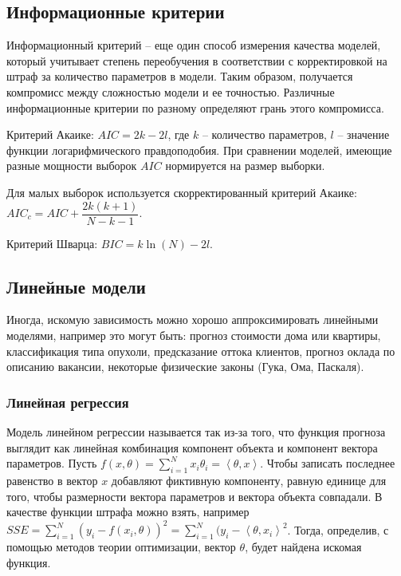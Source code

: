 \subsection{Информационные критерии}

Информационный критерий -- еще один способ измерения качества моделей, который учитывает степень переобучения в соответствии с корректировкой на штраф за количество параметров в модели. Таким образом, получается компромисс между сложностью модели и ее точностью. Различные информационные критерии по разному определяют грань этого компромисса.

\begin{description}[font=$\bullet$]
    \item Критерий Акаике: $AIC = 2k - 2l$, где $k$ -- количество параметров, $l$ -- значение функции логарифмического правдоподобия. При сравнении моделей, имеющие разные мощности выборок $AIC$ нормируется на размер выборки.
    \item Для малых выборок используется скорректированный критерий Акаике: $AIC_c = AIC + \dfrac{2k(k+1)}{N-k-1}$.
    \item Критерий Шварца: $BIC = k\ln(N) - 2l$.
\end{description}

\subsection{Линейные модели}

Иногда, искомую зависимость можно хорошо аппроксимировать линейными моделями, например это могут быть: прогноз стоимости дома или квартиры, классификация типа опухоли, предсказание оттока клиентов, прогноз оклада по описанию вакансии, некоторые физические законы (Гука, Ома, Паскаля).


\subsubsection{Линейная регрессия}

Модель линейном регрессии называется так из-за того, что функция прогноза выглядит как линейная комбинация компонент объекта и компонент вектора параметров. Пусть $f(x,\theta) = \sum\limits_{i=1}^N x_i \theta_i = \left\langle \theta, x \right\rangle $. Чтобы записать последнее равенство в вектор $x$ добавляют фиктивную компоненту, равную единице для того, чтобы размерности вектора параметров и вектора объекта совпадали. В качестве функции штрафа можно взять, например $SSE = \sum\limits_{i=1}^N  (y_i - f(x_i,\theta))^2 = \sum\limits_{i=1}^N  (y_i - \left\langle \theta, x_i\right\rangle ^2$. Тогда, определив, с помощью методов теории оптимизации, вектор $\theta$, будет найдена искомая функция.

